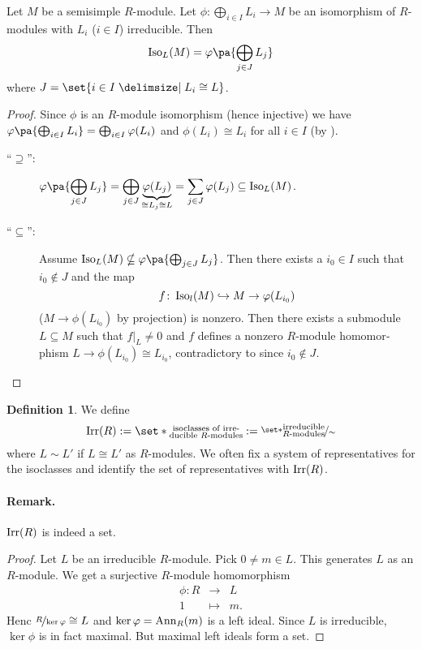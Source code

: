 \documentclass[12pt,a4paper]{scrartcl}
\theoremstyle{cplain}
\theoremstyle{cplain}
\theoremstyle{cplain}
\theoremstyle{definition}
\newtheorem*{deff}{Definition}
\begin{document}
\begin{otherlanguage}{english}
\begin{lem} \label{lem:V.4}
  Let $M$ be a semisimple $R$-module. Let $\phi\colon \bigoplus_{i\in I}L_i \to M$ be an isomorphism of $R$-modules with $L_i$ ($i\in I$) irreducible. Then \[ \Iso_L(M) = \phi\pa{\bigoplus_{j\in J}L_j}\] where $J=\set{i\in I\given L_i \cong L}$.
\end{lem}
\begin{proof}
  Since $\phi$ is an $R$-module isomorphism (hence injective) we have $\phi\pa{\bigoplus_{i\in I} L_i} = \bigoplus_{i\in I}\phi(L_i)$ and $\phi(L_i) \cong L_i$ for all $i\in I$ (by ).
  \begin{description}
    \item[\enquote{$\supseteq$}:] ${\displaystyle \phi\pa{\bigoplus_{j\in J}L_j} =\bigoplus_{j\in J}\underbrace{\phi(L_j)}_{\cong L_j \cong L} = \sum_{j\in J}\phi(L_j) \subseteq \Iso_L(M)}$.
    \item[\enquote{$\subseteq$}:] Assume $\Iso_L(M) \nsubseteq \phi\pa{\bigoplus_{j\in J}L_j}$. Then there exists a $i_0 \in I$ such that $i_0 \notin J$ and the map \[f\colon \operatorname{Iso}_l(M) \hookrightarrow M \to \varphi(L_{i_0})\] ($M\to \phi(L_{i_0})$ by projection) is nonzero. Then there exists a submodule $L\subseteq M$ such that $f|_L \neq 0$ and $f$ defines a nonzero $R$-module homomorphism $L\to \phi(L_{i_0}) \cong L_{i_0}$, contradictory to  since $i_0\notin J$.
    \qedhere
  \end{description}
\end{proof}

\begin{deff}
  We define \[\Irr(R) := \set*{\substack{\text{isoclasses of irre-}\\\text{ducible $R$-modules}}} := \fak{\set*{\substack{\text{irreducible}\\\text{$R$-modules}}}}\sim\] where $L\sim L'$ if $L\cong L'$ as $R$-modules. We often fix a system of representatives for the isoclasses and identify the set of representatives with $\operatorname{Irr}(R)$.
\end{deff}

\paragraph{Remark.}
$\operatorname{Irr}(R)$ is indeed a set.
\begin{proof}
  Let $L$ be an irreducible $R$-module. Pick $0 \neq m\in L$. This generates $L$ as an $R$-module. We get a surjective $R$-module homomorphism
  \begin{eqnarray*}
    \phi\colon R &\to& L \\
    1 &\mapsto& m.
  \end{eqnarray*}
  Henc $\nicefrac{R}{\operatorname{ker}\varphi} \cong L$ and $\operatorname{ker}\varphi = \operatorname{Ann}_R(m)$ is a left ideal. Since $L$ is irreducible, $\ker\phi$ is in fact maximal. But maximal left ideals form a set.
\end{proof}


\end{otherlanguage}
\end{document}
